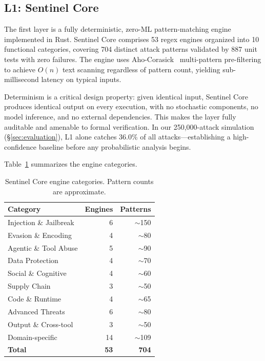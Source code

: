 \subsection{L1: Sentinel Core}
\label{sec:arch:l1}

The first layer is a fully deterministic, zero-ML pattern-matching engine implemented in Rust. Sentinel Core comprises 53 regex engines organized into 10 functional categories, covering 704 distinct attack patterns validated by 887 unit tests with zero failures. The engine uses Aho-Corasick~\cite{ahocorasick1975} multi-pattern pre-filtering to achieve $O(n)$ text scanning regardless of pattern count, yielding sub-millisecond latency on typical inputs.

Determinism is a critical design property: given identical input, Sentinel Core produces identical output on every execution, with no stochastic components, no model inference, and no external dependencies. This makes the layer fully auditable and amenable to formal verification. In our 250,000-attack simulation (\S\ref{sec:evaluation}), L1 alone catches 36.0\% of all attacks---establishing a high-confidence baseline before any probabilistic analysis begins.

Table~\ref{tab:engines} summarizes the engine categories.

\begin{table}[t]
\centering
\small
\caption{Sentinel Core engine categories. Pattern counts are approximate.}
\label{tab:engines}
\begin{tabular}{@{}lrr@{}}
\toprule
Category & Engines & Patterns \\
\midrule
Injection \& Jailbreak & 6 & $\sim$150 \\
Evasion \& Encoding & 4 & $\sim$80 \\
Agentic \& Tool Abuse & 5 & $\sim$90 \\
Data Protection & 4 & $\sim$70 \\
Social \& Cognitive & 4 & $\sim$60 \\
Supply Chain & 3 & $\sim$50 \\
Code \& Runtime & 4 & $\sim$65 \\
Advanced Threats & 6 & $\sim$80 \\
Output \& Cross-tool & 3 & $\sim$50 \\
Domain-specific & 14 & $\sim$109 \\
\midrule
\textbf{Total} & \textbf{53} & \textbf{704} \\
\bottomrule
\end{tabular}
\end{table}

